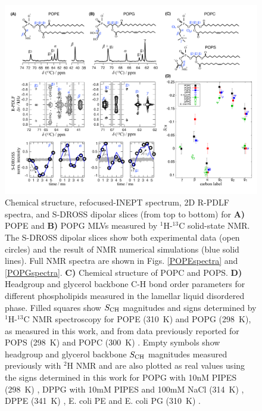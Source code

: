 \documentclass[aps,prl,superscriptaddress,twocolumn]{revtex4}
\begin{document}
\begin{figure}[]
  \centering
   \includegraphics[width=18.0cm]{./Figs/figure_PG_PE.pdf}
   \caption{\label{HGorderParameters}
     Chemical structure, refocused-INEPT spectrum, 2D R-PDLF spectra, and S-DROSS dipolar slices (from top to bottom) for \textbf{A)} POPE  and \textbf{B)} POPG MLVs measured by $^1$H-$^{13}$C solid-state NMR. The S-DROSS dipolar slices show both experimental data (open circles) and the result of NMR numerical simulations (blue solid lines).
     Full NMR spectra are shown in Figs. \ref{POPEspectra} and \ref{POPGspectra}.
     \textbf{C)} Chemical structure of POPC and POPS.
    \textbf{D)} Headgroup and glycerol backbone C-H bond order parameters for different phospholipids measured in the lamellar liquid disordered phase.
    Filled squares show $S_{\rm{CH}}$ magnitudes and signs determined by $^1$H-$^{13}$C NMR spectroscopy for POPE (310~K) and POPG (298~K), as
    measured in this work, and from data previously reported for POPS (298~K) \cite{antila19} and POPC (300~K) \cite{ferreira13,ferreira16}. Empty symbols show headgroup and glycerol backbone $S_{\rm{CH}}$ magnitudes measured previously with $^2$H NMR and are also plotted as real values using the signs determined in this work for 
    POPG with 10nM PIPES (298~K) \cite{borle85},
    DPPG with 10mM PIPES and 100mM NaCl (314~K) \cite{wohlgemuth80}, 
    DPPE (341~K) \cite{seelig76},
    E. coli PE and E. coli PG (310~K) \cite{gally81}
    .
   }
\end{figure}
\end{document}
